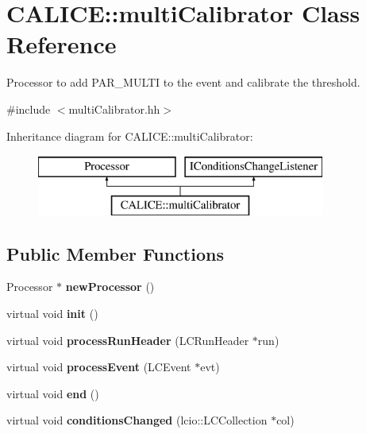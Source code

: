 \section{C\-A\-L\-I\-C\-E\-:\-:multi\-Calibrator Class Reference}
\label{classCALICE_1_1multiCalibrator}


Processor to add P\-A\-R\-\_\-\-M\-U\-L\-T\-I to the event and calibrate the threshold.  




{\ttfamily \#include $<$multi\-Calibrator.\-hh$>$}

Inheritance diagram for C\-A\-L\-I\-C\-E\-:\-:multi\-Calibrator\-:\begin{figure}[H]
\begin{center}
\leavevmode
\includegraphics[height=2.000000cm]{classCALICE_1_1multiCalibrator}
\end{center}
\end{figure}
\subsection*{Public Member Functions}
\begin{DoxyCompactItemize}
\item 
Processor $\ast$ {\bfseries new\-Processor} ()\label{classCALICE_1_1multiCalibrator_ad18beb97b5deccfa062ed368644fce16}

\item 
virtual void {\bfseries init} ()\label{classCALICE_1_1multiCalibrator_a8a3e419d429f42b6ea7aae4b52428ce4}

\item 
virtual void {\bfseries process\-Run\-Header} (L\-C\-Run\-Header $\ast$run)\label{classCALICE_1_1multiCalibrator_a67d14b42a9ce88fc17515613efe997bc}

\item 
virtual void {\bfseries process\-Event} (L\-C\-Event $\ast$evt)\label{classCALICE_1_1multiCalibrator_a7664b108349a27d1497d52d55001dc41}

\item 
virtual void {\bfseries end} ()\label{classCALICE_1_1multiCalibrator_a156e6823b5819c32c0c1530f9cf17787}

\item 
virtual void {\bfseries conditions\-Changed} (lcio\-::\-L\-C\-Collection $\ast$col)\label{classCALICE_1_1multiCalibrator_aae74a036fde33453359d9938bacd8475}

\end{DoxyCompactItemize}
